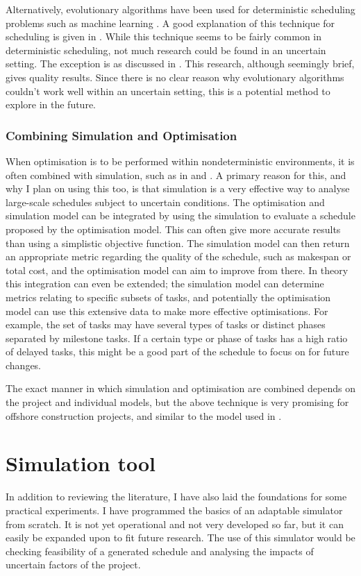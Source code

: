 \documentclass[a4paper,12pt]{article}
\begin{document}
Alternatively, evolutionary algorithms have been used for deterministic scheduling problems such as machine learning \cite{dorndorf1995evolution}. A good explanation of this technique for scheduling is given in \cite{cotta2007memetic}. While this technique seems to be fairly common in deterministic scheduling, not much research could be found in an uncertain setting. The exception is \cite{sevaux2002genetic} as discussed in . This research, although seemingly brief, gives quality results. Since there is no clear reason why evolutionary algorithms couldn't work well within an uncertain setting, this is a potential method to explore in the future. 

\subsubsection{Combining Simulation and Optimisation} \label{ss:simopt}
When optimisation is to be performed within nondeterministic environments, it is often combined with simulation, such as in \cite{de2003integrating} and \cite{bard2015integrating}. A primary reason for this, and why I plan on using this too, is that simulation is a very effective way to analyse large-scale schedules subject to uncertain conditions. The optimisation and simulation model can be integrated by using the simulation to evaluate a schedule proposed by the optimisation model. This can often give more accurate results than using a simplistic objective function. The simulation model can then return an appropriate metric regarding the quality of the schedule, such as makespan or total cost, and the optimisation model can aim to improve from there. In theory this integration can even be extended; the simulation model can determine metrics relating to specific subsets of tasks, and potentially the optimisation model can use this extensive data to make more effective optimisations. For example, the set of tasks may have several types of tasks or distinct phases separated by milestone tasks. If a certain type or phase of tasks has a high ratio of delayed tasks, this might be a good part of the schedule to focus on for future changes. 

The exact manner in which simulation and optimisation are combined depends on the project and individual models, but the above technique is very promising for offshore construction projects, and similar to the model used in \cite{kerkhove2017optimised}. 

\pagebreak

\section{Simulation tool} \label{s:sim}
In addition to reviewing the literature, I have also laid the foundations for some practical experiments. I have programmed the basics of an adaptable simulator from scratch. It is not yet operational and not very developed so far, but it can easily be expanded upon to fit future research. The use of this simulator would be checking feasibility of a generated schedule and analysing the impacts of uncertain factors of the project.
\end{document}

